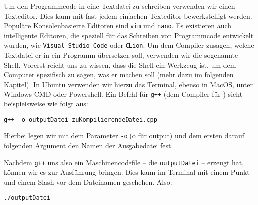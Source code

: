 Um den Programmcode in eine Textdatei zu schreiben verwenden wir einen Texteditor.
Dies kann mit fast jedem einfachen Texteditor bewerkstelligt werden. Populäre Konsolenbasierte Editoren sind \texttt{vim} und \texttt{nano}. Es existieren auch intelligente Editoren, die speziell für das Schreiben von Programmcode entwickelt wurden, wie \texttt{Visual Studio Code} oder \texttt{CLion}.
Um dem Compiler zusagen, welche Textdatei er in ein Programm übersetzen soll, verwenden wir die sogenannte Shell. Vorerst reicht uns zu wissen, dass die Shell
ein Werkzeug ist, um dem Computer spezifisch zu sagen, was er machen soll (mehr dazu im folgenden Kapitel). In Ubuntu verwenden wir hierzu das Terminal, ebenso in MacOS,
unter Windows CMD oder Powershell. Ein Befehl für \texttt{g++} (dem Compiler für \Cpp) sieht beispielsweise wie folgt aus:

\begin{center}
    \texttt{g++ -o outputDatei zuKompilierendeDatei.cpp}
\end{center}
Hierbei legen wir mit dem Parameter \texttt{-o} (o für output) und dem ersten darauf folgenden Argument den Namen der Ausgabedatei fest.

Nachdem \texttt{g++} uns also ein Maschinencodefile -- die \texttt{outputDatei} --
erzeugt hat, können wir es zur Ausführung bringen. Dies kann im Terminal mit einem Punkt und einem Slash vor dem Dateinamen geschehen. Also:
\begin{center}
    \texttt{./outputDatei}
\end{center}



